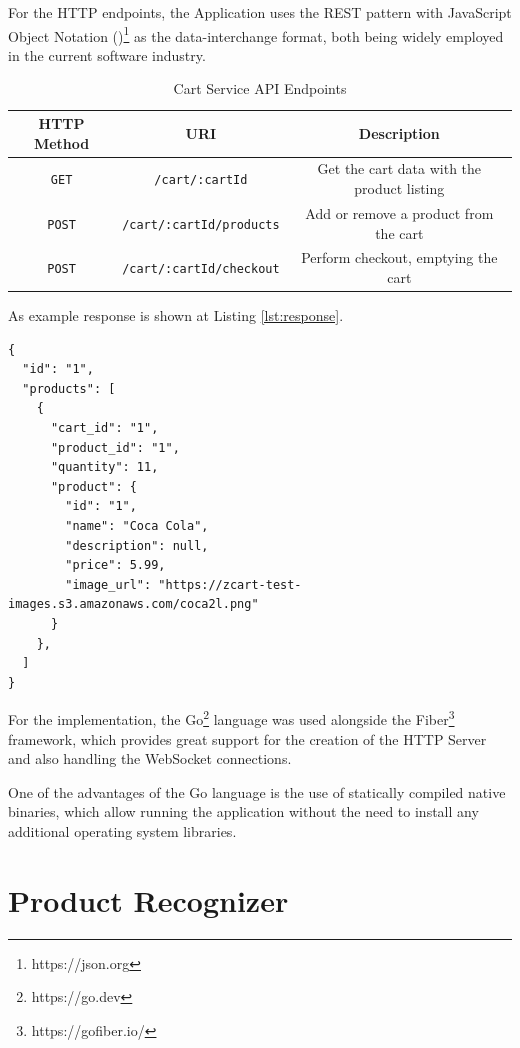 \documentclass[openright]{normas-utf-tex} %
\begin{document}
For the HTTP endpoints, the Application uses the REST \cite{Roy2000} pattern
with JavaScript Object Notation ()\footnote{https://json.org} as the data-interchange format, both
being widely employed in the current software industry.

\begin{table}[H]
	\centering
	\label{tab:correlacao}
	\begin{tabular}{c c|c}
		\hline 
        HTTP Method & URI & Description \\
		\hline
        \texttt{GET} & \texttt{/cart/:cartId} & Get the cart data with the product listing \\
        \texttt{POST} & \texttt{/cart/:cartId/products} & Add or remove a product from the cart \\
        \texttt{POST} & \texttt{/cart/:cartId/checkout} & Perform checkout, emptying the cart \\
		\hline 
	\end{tabular}
	\caption[Cart Service API endpoints]{Cart Service API Endpoints}
\end{table}

As example response is shown at Listing \ref{lst:response}.

\begin{lstlisting}[caption={Example response for the \texttt{GET /cart/:cartId} endpoint using JSON},label={lst:response}]
{
  "id": "1",
  "products": [
    {
      "cart_id": "1",
      "product_id": "1",
      "quantity": 11,
      "product": {
        "id": "1",
        "name": "Coca Cola",
        "description": null,
        "price": 5.99,
        "image_url": "https://zcart-test-images.s3.amazonaws.com/coca2l.png"
      }
    },
  ]
}
\end{lstlisting}

For the implementation, the Go\footnote{https://go.dev} language was used
alongside the Fiber\footnote{https://gofiber.io/} framework, which provides
great support for the creation of the HTTP Server and also handling the
WebSocket connections.

One of the advantages of the Go language is the use of statically compiled
native binaries, which allow running the application without the need to
install any additional operating system libraries.

\section{Product Recognizer}
\end{document}
